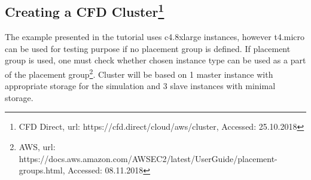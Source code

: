 \documentclass[12pt,english]{article}
\begin{document}
\subsection{\label{Creating a CFD Cluster}Creating a CFD Cluster\footnote{CFD Direct, url: https://cfd.direct/cloud/aws/cluster, Accessed: 25.10.2018}}

The example presented in the tutorial uses c4.8xlarge instances, however t4.micro can be used for testing purpose if no placement group is defined. If placement group is used, one must check whether chosen instance type can be used as a part of the placement group\footnote{AWS, url: https://docs.aws.amazon.com/AWSEC2/latest/UserGuide/placement-groups.html, Accessed: 08.11.2018}. Cluster will be based on 1 master instance with appropriate storage for the simulation and 3 slave instances with minimal storage.
\end{document}
